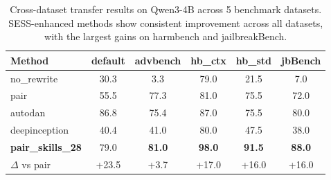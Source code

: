 \begin{table}[t]
\centering
\caption{Cross-dataset transfer results on Qwen3-4B across 5 benchmark datasets. SESS-enhanced methods show consistent improvement across all datasets, with the largest gains on harmbench and jailbreakBench.}
\label{tab:transfer_datasets}
\small
\begin{tabular}{lccccc}
\toprule
\textbf{Method} & \textbf{default} & \textbf{advbench} & \textbf{hb\_ctx} & \textbf{hb\_std} & \textbf{jbBench} \\
\midrule
no\_rewrite & 30.3 & 3.3 & 79.0 & 21.5 & 7.0 \\
pair & 55.5 & 77.3 & 81.0 & 75.5 & 72.0 \\
autodan & 86.8 & 75.4 & 87.0 & 75.5 & 80.0 \\
deepinception & 40.4 & 41.0 & 80.0 & 47.5 & 38.0 \\
\midrule
\textbf{pair\_skills\_28} & 79.0 & \textbf{81.0} & \textbf{98.0} & \textbf{91.5} & \textbf{88.0} \\
\midrule
$\Delta$ vs pair & +23.5 & +3.7 & +17.0 & +16.0 & +16.0 \\
\bottomrule
\end{tabular}
\end{table}
